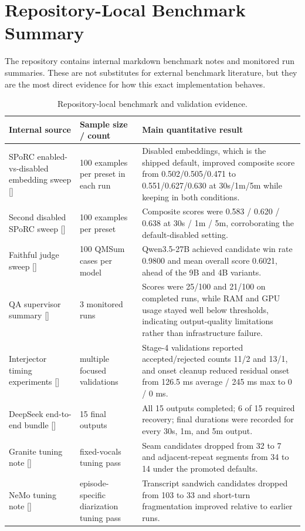 \chapter{Repository-Local Benchmark Summary}

The repository contains internal markdown benchmark notes and monitored run summaries. These are not substitutes for external benchmark literature, but they are the most direct evidence for how this exact implementation behaves.

\begin{table}[H]
\centering
\footnotesize
\begin{tabularx}{\textwidth}{L{2.8cm}L{1.2cm}Y}
\toprule
Internal source & Sample size / count & Main quantitative result \\
\midrule
SPoRC enabled-vs-disabled embedding sweep [\cite{internal_sporc_duration_sweep_enabled_20260319,internal_sporc_duration_sweep_20260320}] & 100 examples per preset in each run & Disabled embeddings, which is the shipped default, improved composite score from 0.502/0.505/0.471 to 0.551/0.627/0.630 at 30s/1m/5m while keeping  in both conditions. \\
Second disabled SPoRC sweep [\cite{internal_sporc_duration_sweep_disabled_20260320b}] & 100 examples per preset & Composite scores were 0.583 / 0.620 / 0.638 at 30s / 1m / 5m, corroborating the default-disabled setting. \\
Faithful judge sweep [\cite{internal_faithful_judge_sweep_20260313}] & 100 QMSum cases per model & Qwen3.5-27B achieved candidate win rate 0.9800 and mean overall score 0.6021, ahead of the 9B and 4B variants. \\
QA supervisor summary [\cite{internal_qa_supervisor_vllm_20260312}] & 3 monitored runs & Scores were 25/100 and 21/100 on completed runs, while RAM and GPU usage stayed well below thresholds, indicating output-quality limitations rather than infrastructure failure. \\
Interjector timing experiments [\cite{internal_interjector_timing_20260325}] & multiple focused validations & Stage-4 validations reported accepted/rejected counts 11/2 and 13/1, and onset cleanup reduced residual onset from 126.5 ms average / 245 ms max to 0 / 0 ms. \\
DeepSeek end-to-end bundle [\cite{internal_deepseek_batch_report_20260324,internal_deepseek_bundle_20260324}] & 15 final outputs & All 15 outputs completed; 6 of 15 required recovery; final durations were recorded for every 30s, 1m, and 5m output. \\
Granite tuning note [\cite{internal_granite_tuning_20260318}] & fixed-vocals tuning pass & Seam candidates dropped from 32 to 7 and adjacent-repeat segments from 34 to 14 under the promoted defaults. \\
NeMo tuning note [\cite{internal_nemo_tuning_20260318}] & episode-specific diarization tuning pass & Transcript sandwich candidates dropped from 103 to 33 and short-turn fragmentation improved relative to earlier runs. \\
\bottomrule
\end{tabularx}
\caption{Repository-local benchmark and validation evidence.}
\label{tab:internal-summary}
\end{table}
